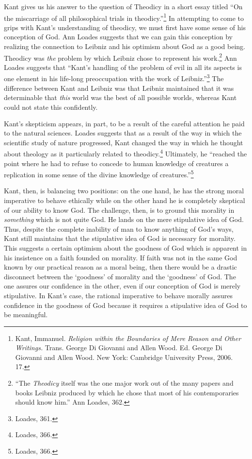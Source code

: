 \documentclass[12pt]{article}
\begin{document}
	Kant gives us his answer to the question of Theodicy in a short essay titled ``On the miscarriage of all philosophical trials in theodicy.''\footnote{Kant, Immanuel. \emph{Religion within the Boundaries of Mere Reason and Other Writings.} Trans. George Di Giovanni and Allen Wood. Ed. George Di Giovanni and Allen Wood. New York: Cambridge University Press, 2006. 17.} In attempting to come to grips with Kant's understanding of theodicy, we must first have some sense of his conception of God. Ann Loades suggests that we can gain this conception by realizing the connection to Leibniz and his optimism about God as a good being. Theodicy was \emph{the} problem by which Leibniz chose to represent his work.\footnote{``The \emph{Theodicy} itself was the one major work out of the many papers and books Leibniz produced by which he chose that most of his contemporaries should know him.'' Ann Loades, 362.} Ann Loades suggests that ``Kant's handling of the problem of evil in all its aspects is one element in his life-long preoccupation with the work of Leibniz.''\footnote{Loades, 361.} The difference between Kant and Leibniz was that Leibniz maintained that it was determinable that \emph{this} world was the best of all possible worlds, whereas Kant could not state this confidently. 
	
	Kant's skepticism appears, in part, to be a result of the careful attention he paid to the natural sciences. Loades suggests that as a result of the way in which the scientific study of nature progressed, Kant changed the way in which he thought about theology as it particularly related to theodicy.\footnote{Loades, 366.} Ultimately, he ``reached the point where he had to refuse to concede to human knowledge of creatures a replication in some sense of the divine knowledge of creatures.''\footnote{Loades, 366.} 
	
	Kant, then, is balancing two positions: on the one hand, he has the strong moral imperative to behave ethically while on the other hand he is completely skeptical of our ability to know God. The challenge, then, is to ground this morality in \emph{something} which is not quite God. He lands on the mere stipulative idea of God. Thus, despite the complete inability of man to know anything of God's ways, Kant still maintains that the stipulative idea of God is necessary for morality. This suggests a certain optimism about the goodness of God which is apparent in his insistence on a faith founded on morality. If faith was not in the same God known by our practical reason as a moral being, then there would be a drastic disconnect between the `goodness' of morality and the `goodness' of God. The one assures our confidence in the other, even if our conception of God is merely stipulative. In Kant's case, the rational imperative to behave morally assures confidence in the goodness of God because it requires a stipulative idea of God to be meaningful.
\end{document}

